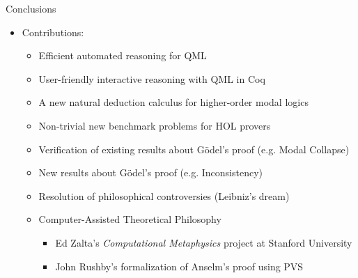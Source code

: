 


\begin{frame}{Conclusions} \large

\begin{itemize}
\item Contributions: \\[.5em]
\begin{itemize}
\item Efficient automated reasoning for QML \\[.3em]
\item \alert{User-friendly interactive reasoning with QML in Coq} \\[.3em]
\item \alert{A new natural deduction calculus for higher-order modal logics} \\[.3em]
\item Non-trivial new benchmark problems for HOL provers \\[.3em]
\item Verification of existing results about G\"odel's proof (e.g. Modal Collapse) \\[.3em]
\item New results about G\"odel's proof (e.g. Inconsistency) \\[.3em]
\item Resolution of philosophical controversies (Leibniz's dream) \\[.3em]
\item Computer-Assisted Theoretical Philosophy \\[.3em]
 \begin{itemize}
  \item Ed Zalta's \emph{Computational Metaphysics} project at Stanford University \\[.2em]
  \item John Rushby's formalization of Anselm's proof using PVS
  \end{itemize}
\end{itemize}

\end{itemize}
\end{frame}